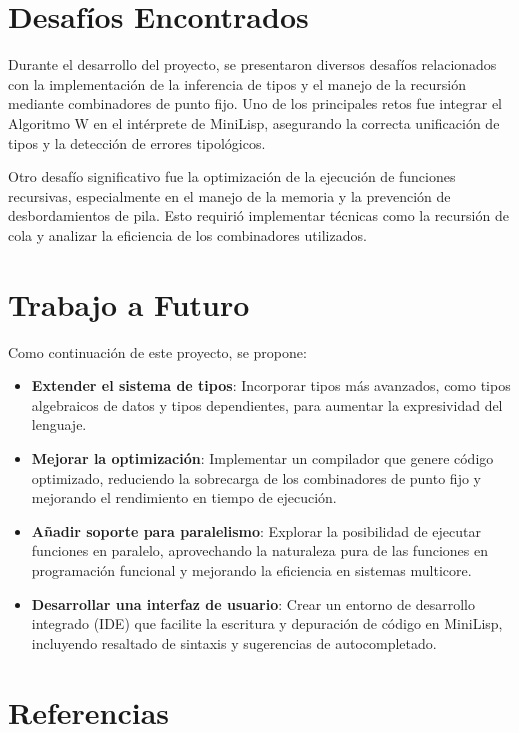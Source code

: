 \documentclass{article}
\begin{document}
  \section{Desafíos Encontrados}

  Durante el desarrollo del proyecto, se presentaron diversos desafíos relacionados con la implementación de la inferencia de tipos y el manejo de la recursión mediante combinadores de punto fijo. Uno de los principales retos fue integrar el Algoritmo W en el intérprete de MiniLisp, asegurando la correcta unificación de tipos y la detección de errores tipológicos.

  Otro desafío significativo fue la optimización de la ejecución de funciones recursivas, especialmente en el manejo de la memoria y la prevención de desbordamientos de pila. Esto requirió implementar técnicas como la recursión de cola y analizar la eficiencia de los combinadores utilizados.

  \section{Trabajo a Futuro}

  Como continuación de este proyecto, se propone:

  \begin{itemize}
    \item \textbf{Extender el sistema de tipos}: Incorporar tipos más avanzados, como tipos algebraicos de datos y tipos dependientes, para aumentar la expresividad del lenguaje.

    \item \textbf{Mejorar la optimización}: Implementar un compilador que genere código optimizado, reduciendo la sobrecarga de los combinadores de punto fijo y mejorando el rendimiento en tiempo de ejecución.

    \item \textbf{Añadir soporte para paralelismo}: Explorar la posibilidad de ejecutar funciones en paralelo, aprovechando la naturaleza pura de las funciones en programación funcional y mejorando la eficiencia en sistemas multicore.

    \item \textbf{Desarrollar una interfaz de usuario}: Crear un entorno de desarrollo integrado (IDE) que facilite la escritura y depuración de código en MiniLisp, incluyendo resaltado de sintaxis y sugerencias de autocompletado.
  \end{itemize}

  \section{Referencias}
\end{document}
